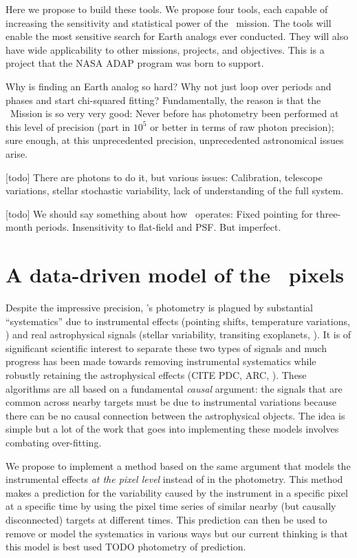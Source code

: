 \documentclass[letterpaper,12pt,preprint]{hack_aastex}
\begin{document}
Here we propose to build these tools.
We propose four tools, each capable of increasing the sensitivity and
statistical power of the \Kepler\ mission.
The tools will enable the most sensitive search for Earth analogs ever
conducted.
They will also have wide applicability to other missions, projects, and
objectives.
This is a project that the NASA ADAP program was born to support.

Why is finding an Earth analog so hard?
Why not just loop over periods and phases and start chi-squared fitting?
Fundamentally, the reason is that the \Kepler\ Mission is so very very good:
Never before has photometry been performed at this level of precision (part
in $10^{5}$ or better in terms of raw photon precision);
sure enough, at this unprecedented precision, unprecedented astronomical
issues arise.

[todo] There are photons to do it, but various issues:  Calibration, telescope variations, stellar stochastic variability, lack of understanding of the full system.

[todo] We should say something about how \Kepler\ operates:  Fixed pointing for three-month periods.  Insensitivity to flat-field and PSF.  But imperfect.

\section{A data-driven model of the \Kepler\ pixels}

Despite the impressive precision, \Kepler's photometry is plagued by
substantial ``systematics'' due to instrumental effects (pointing shifts,
temperature variations, \etc) and real astrophysical signals (stellar
variability, transiting exoplanets, \etc).
It is of significant scientific interest to separate these two types of
signals and much progress has been made towards removing instrumental
systematics while robustly retaining the astrophysical effects (CITE PDC, ARC,
\etc).
These algorithms are all based on a fundamental \emph{causal} argument: the
signals that are common across nearby targets must be due to instrumental
variations because there can be no causal connection between the astrophysical
objects.
The idea is simple but a lot of the work that goes into implementing these
models involves combating over-fitting.

We propose to implement a method based on the same argument that models the
instrumental effects \emph{at the pixel level} instead of in the photometry.
This method makes a prediction for the variability caused by the instrument in
a specific pixel at a specific time by using the pixel time series of similar
nearby (but causally disconnected) targets at different times.
This prediction can then be used to remove or model the systematics in various
ways but our current thinking is that this model is best used TODO photometry
of prediction.
\end{document}
